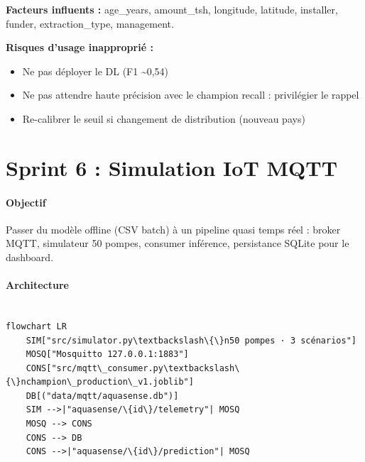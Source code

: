 \documentclass[11pt,a4paper]{report}
\begin{document}
\textbf{Facteurs influents :} age\_years, amount\_tsh, longitude, latitude, installer, funder, extraction\_type, management.



\textbf{Risques d'usage inapproprié :}



\begin{itemize}

\item Ne pas déployer le DL (F1 \textasciitilde{}0,54)

\item Ne pas attendre haute précision avec le champion recall : privilégier le rappel

\item Re-calibrer le seuil si changement de distribution (nouveau pays)

\end{itemize}





\chapter{Sprint 6 : Simulation IoT MQTT}



\subsubsection{Objectif}



Passer du modèle offline (CSV batch) à un pipeline quasi temps réel : broker MQTT, simulateur 50 pompes, consumer inférence, persistance SQLite pour le dashboard.



\subsubsection{Architecture}



\begin{lstlisting}

flowchart LR
    SIM["src/simulator.py\textbackslash\{\}n50 pompes · 3 scénarios"]
    MOSQ["Mosquitto 127.0.0.1:1883"]
    CONS["src/mqtt\_consumer.py\textbackslash\{\}nchampion\_production\_v1.joblib"]
    DB[("data/mqtt/aquasense.db")]
    SIM -->|"aquasense/\{id\}/telemetry"| MOSQ
    MOSQ --> CONS
    CONS --> DB
    CONS -->|"aquasense/\{id\}/prediction"| MOSQ

\end{lstlisting}
\end{document}

